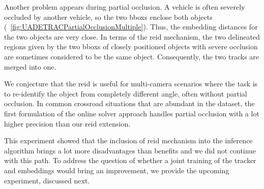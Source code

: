 Another problem appears during partial occlusion. A vehicle is often severely occluded by another vehicle, so the two \glspl{bbox} enclose both objects (\figtext{}~\ref{fig:UADETRACPartialOcclusionMultiple}). Thus, the embedding distances for the two objects are very close. In terms of the \gls{reid} mechanism, the two delineated regions given by the two \glspl{bbox} of closely positioned objects with severe occlusion are sometimes considered to be the same object. Consequently, the two tracks are merged into one.

We conjecture that the \gls{reid} is useful for multi-camera scenarios where the task is to re-identify the object from completely different angle, often without partial occlusion. In common crossroad situations that are abundant in the \uadetrac{} dataset, the first formulation of the online solver approach handles partial occlusion with a lot higher precision than our \gls{reid} extension.

This experiment showed that the inclusion of \gls{reid} mechanism into the inference algorithm brings a lot more disadvantages than benefits and we did not continue with this path. To address the question of whether a joint training of the tracker and embeddings would bring an improvement, we provide the upcoming experiment, discussed next.
